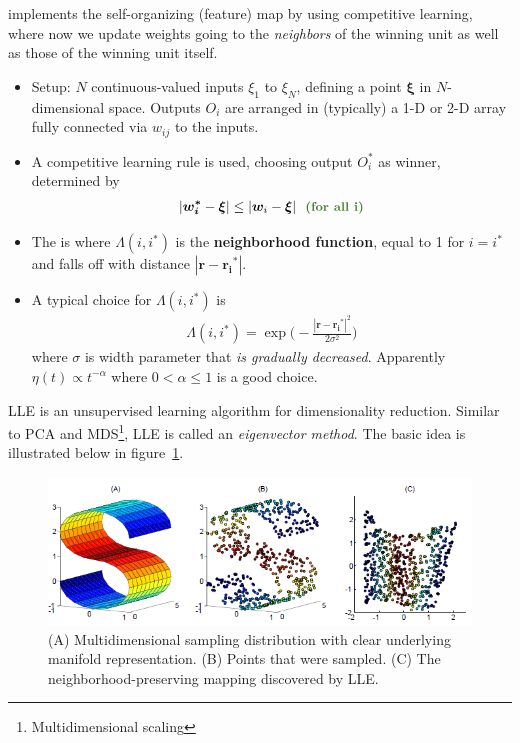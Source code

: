 \documentclass[12pt]{article}
\begin{document}
\p {} implements the self-organizing (feature) map by using competitive learning, where now we update weights going to the \textit{neighbors} of the winning unit as well as those of the winning unit itself. 
\begin{itemize}
	\item Setup: $N$ continuous-valued inputs $\xi_1$ to $\xi_N$, defining a point $\bm{\xi}$ in $N$-dimensional space. Outputs $O_i$ are arranged in (typically) a 1-D or 2-D array fully connected via $w_{ij}$ to the inputs. 
	
	\item A competitive learning rule is used, choosing output $O_i^*$ as winner, determined by
	\begin{align}
		|\bm{w_i^*} - \bm{\xi}| \le |\bm{w}_i - \bm{\xi}| ~~ \mgreen{\text{(for all i)}}
	\end{align}
	
	\item The  is 
	where $\Lambda(i, i^*)$ is the \textbf{neighborhood function}, equal to 1 for $i = i^*$ and falls off with distance $|\bm{r} - \bm{r_i}^*|$. 
	
	\item A typical choice for $\Lambda(i, i^*)$ is
	\begin{align}
		\Lambda(i, i^*) = \exp\bigg(- \frac{|\bm{r} - \bm{r_i}^*|^2}{2 \sigma^2} \bigg)
	\end{align}
	where $\sigma$ is width parameter that \textit{is gradually decreased}. Apparently $\eta(t) \propto t^{-\alpha}$ where $0 < \alpha \le 1$ is a good choice. 
\end{itemize}



%
%
%

LLE is an unsupervised learning algorithm for dimensionality reduction. Similar to PCA and MDS\footnote{Multidimensional scaling}, LLE is called an \textit{eigenvector method}. The basic idea is illustrated below in figure~\ref{LLE}. \\

\begin{figure}[b!]
	\centering
	\includegraphics[]{LLE.PNG}
	\caption{(A) Multidimensional sampling distribution with clear underlying manifold representation. (B) Points that were sampled. (C) The neighborhood-preserving mapping discovered by LLE. }
	\label{LLE}
\end{figure}
\end{document}

